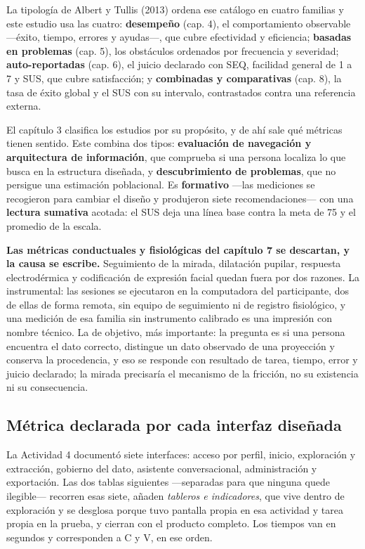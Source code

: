 La tipología de Albert y Tullis (2013) ordena ese catálogo en cuatro familias y este estudio usa
las cuatro: \textbf{desempeño} (cap. 4), el comportamiento observable ---éxito, tiempo, errores y
ayudas---, que cubre efectividad y eficiencia; \textbf{basadas en problemas} (cap. 5), los
obstáculos ordenados por frecuencia y severidad; \textbf{auto-reportadas} (cap. 6), el juicio
declarado con SEQ, facilidad general de 1 a 7 y SUS, que cubre satisfacción; y \textbf{combinadas
y comparativas} (cap. 8), la tasa de éxito global y el SUS con su intervalo, contrastados contra
una referencia externa.

El capítulo 3 clasifica los estudios por su propósito, y de ahí sale qué métricas tienen sentido.
Este combina dos tipos: \textbf{evaluación de navegación y arquitectura de información}, que
comprueba si una persona localiza lo que busca en la estructura diseñada, y \textbf{descubrimiento
de problemas}, que no persigue una estimación poblacional. Es \textbf{formativo} ---las mediciones
se recogieron para cambiar el diseño y produjeron siete recomendaciones--- con una \textbf{lectura
sumativa} acotada: el SUS deja una línea base contra la meta de 75 y el promedio de la escala.

\begin{uxdestacado}
\textbf{Las métricas conductuales y fisiológicas del capítulo 7 se descartan, y la causa se
escribe.} Seguimiento de la mirada, dilatación pupilar, respuesta electrodérmica y codificación de
expresión facial quedan fuera por dos razones. La instrumental: las sesiones se ejecutaron en la
computadora del participante, dos de ellas de forma remota, sin equipo de seguimiento ni de
registro fisiológico, y una medición de esa familia sin instrumento calibrado es una impresión con
nombre técnico. La de objetivo, más importante: la pregunta es si una persona encuentra el dato
correcto, distingue un dato observado de una proyección y conserva la procedencia, y eso se
responde con resultado de tarea, tiempo, error y juicio declarado; la mirada precisaría el
mecanismo de la fricción, no su existencia ni su consecuencia.
\end{uxdestacado}

\subsection{Métrica declarada por cada interfaz diseñada}

La Actividad 4 documentó siete interfaces: acceso por perfil, inicio, exploración y extracción,
gobierno del dato, asistente conversacional, administración y exportación. Las dos tablas
siguientes ---separadas para que ninguna quede ilegible--- recorren esas siete, añaden
\emph{tableros e indicadores}, que vive dentro de exploración y se desglosa porque tuvo pantalla
propia en esa actividad y tarea propia en la prueba, y cierran con el producto completo. Los
tiempos van en segundos y corresponden a C y V, en ese orden.

